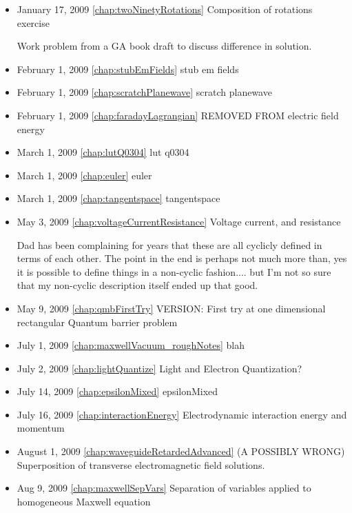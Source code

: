 \begin{itemize}
\item January 17, 2009 \ref{chap:twoNinetyRotations} Composition of rotations exercise

Work problem from a GA book draft to discuss difference in solution. \item February 1, 2009 \ref{chap:stubEmFields} stub em fields

\item February 1, 2009 \ref{chap:scratchPlanewave} scratch planewave

\item February 1, 2009 \ref{chap:faradayLagrangian} REMOVED FROM electric field energy

\item March 1, 2009 \ref{chap:lutQ0304} lut q0304

\item March 1, 2009 \ref{chap:euler} euler

\item March 1, 2009 \ref{chap:tangentspace} tangentspace

\item May 3, 2009 \ref{chap:voltageCurrentResistance} Voltage current, and resistance

Dad has been complaining for years that these are all cyclicly defined in terms of each other.  The point in the end is perhaps not much more than, yes it is possible to define things in a non-cyclic fashion.... but I'm not so sure that my non-cyclic description itself ended up that good. \item May 9, 2009 \ref{chap:qmbFirstTry} VERSION: First try at one dimensional rectangular Quantum barrier problem

\item July 1, 2009 \ref{chap:maxwellVacuum_roughNotes} blah

\item July 2, 2009 \ref{chap:lightQuantize} Light and Electron Quantization?

\item July 14, 2009 \ref{chap:epsilonMixed} epsilonMixed

\item July 16, 2009 \ref{chap:interactionEnergy} Electrodynamic interaction energy and momentum

\item August 1, 2009 \ref{chap:waveguideRetardedAdvanced} (A POSSIBLY WRONG) Superposition of transverse electromagnetic field solutions.

\item Aug 9, 2009 \ref{chap:maxwellSepVars} Separation of variables applied to homogeneous Maxwell equation


\end{itemize}
